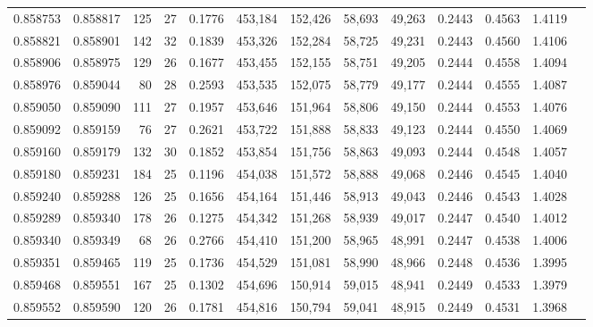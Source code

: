 \begin{tabular}{rrrrrrrrrrrrr}
0.858753 & 0.858817 &   125 &  27 &                                     0.1776 & 453,184 & 152,426 &  58,693 &  49,263 & 0.2443 & 0.4563 & 1.4119 \\
0.858821 & 0.858901 &   142 &  32 &                                     0.1839 & 453,326 & 152,284 &  58,725 &  49,231 & 0.2443 & 0.4560 & 1.4106 \\
0.858906 & 0.858975 &   129 &  26 &                                     0.1677 & 453,455 & 152,155 &  58,751 &  49,205 & 0.2444 & 0.4558 & 1.4094 \\
0.858976 & 0.859044 &    80 &  28 &                                     0.2593 & 453,535 & 152,075 &  58,779 &  49,177 & 0.2444 & 0.4555 & 1.4087 \\
0.859050 & 0.859090 &   111 &  27 &                                     0.1957 & 453,646 & 151,964 &  58,806 &  49,150 & 0.2444 & 0.4553 & 1.4076 \\
0.859092 & 0.859159 &    76 &  27 &                                     0.2621 & 453,722 & 151,888 &  58,833 &  49,123 & 0.2444 & 0.4550 & 1.4069 \\
0.859160 & 0.859179 &   132 &  30 &                                     0.1852 & 453,854 & 151,756 &  58,863 &  49,093 & 0.2444 & 0.4548 & 1.4057 \\
0.859180 & 0.859231 &   184 &  25 &                                     0.1196 & 454,038 & 151,572 &  58,888 &  49,068 & 0.2446 & 0.4545 & 1.4040 \\
0.859240 & 0.859288 &   126 &  25 &                                     0.1656 & 454,164 & 151,446 &  58,913 &  49,043 & 0.2446 & 0.4543 & 1.4028 \\
0.859289 & 0.859340 &   178 &  26 &                                     0.1275 & 454,342 & 151,268 &  58,939 &  49,017 & 0.2447 & 0.4540 & 1.4012 \\
0.859340 & 0.859349 &    68 &  26 &                                     0.2766 & 454,410 & 151,200 &  58,965 &  48,991 & 0.2447 & 0.4538 & 1.4006 \\
0.859351 & 0.859465 &   119 &  25 &                                     0.1736 & 454,529 & 151,081 &  58,990 &  48,966 & 0.2448 & 0.4536 & 1.3995 \\
0.859468 & 0.859551 &   167 &  25 &                                     0.1302 & 454,696 & 150,914 &  59,015 &  48,941 & 0.2449 & 0.4533 & 1.3979 \\
0.859552 & 0.859590 &   120 &  26 &                                     0.1781 & 454,816 & 150,794 &  59,041 &  48,915 & 0.2449 & 0.4531 & 1.3968 \\

\end{tabular}
